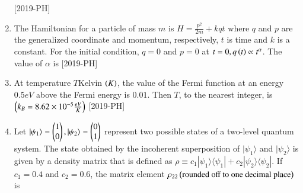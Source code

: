 \documentclass[journal]{IEEEtran}
\begin{document}
\begin{enumerate}[start=27]
    \hfill{[2019-PH]}\\
\item The Hamiltonian for a particle of mass $m$ is $H=\frac{p^{2}}{2m}+kqt$ where $q$ and $p$ are the generalized coordinate and momentum, respectively, $t$ is time and $k$ is a constant. For the initial condition, $q=0$ and $p=0$ at $t=0, q\left(t\right) \propto t^\alpha$. The value of $\alpha$ is \underline{\hspace{1cm}} \hfill{[2019-PH]}\\
\item At temperature $T$Kelvin $\left(K\right)$, the value of the Fermi function at an energy $0.5eV$ above the Fermi energy is $0.01$. Then $T$, to the nearest integer, is \underline{\hspace{1cm}}
$\left(k_B=8.62 \times 10^{-5} \frac{eV}{K}\right)$ \hfill{[2019-PH]}\\
\item Let $|\psi_1\rangle=\begin{pmatrix}1\\0\end{pmatrix}, |\psi_2 \rangle=\begin{pmatrix}0\\1\end{pmatrix}$ represent two possible states of a two-level quantum system. The state obtained by the incoherent superposition of $|\psi_1\rangle$ and $|\psi_2\rangle$ is given by a density matrix that is defined as $\rho \equiv c_1|\psi_1\rangle \langle\psi_1|+c_2|\psi_2\rangle \langle\psi_2|$. If $c_1=0.4$ and $c_2=0.6$, the matrix element $\rho_{22} \left(\text{rounded off to one decimal place}\right)$ is \underline{\hspace{1cm}} 


\end{enumerate}
\end{document}
